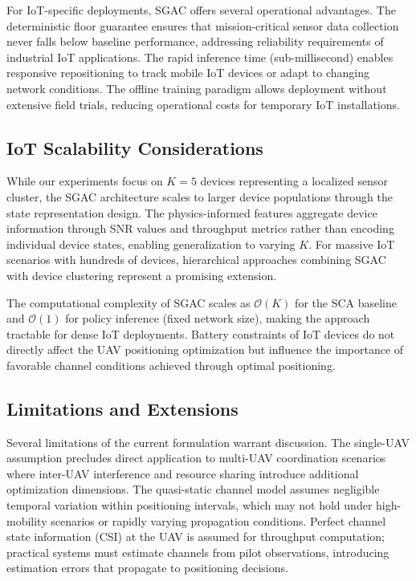 \documentclass[journal]{IEEEtran}
\begin{document}
For IoT-specific deployments, SGAC offers several operational advantages. The deterministic floor guarantee ensures that mission-critical sensor data collection never falls below baseline performance, addressing reliability requirements of industrial IoT applications. The rapid inference time (sub-millisecond) enables responsive repositioning to track mobile IoT devices or adapt to changing network conditions. The offline training paradigm allows deployment without extensive field trials, reducing operational costs for temporary IoT installations.

\subsection{IoT Scalability Considerations}

While our experiments focus on $K=5$ devices representing a localized sensor cluster, the SGAC architecture scales to larger device populations through the state representation design. The physics-informed features aggregate device information through SNR values and throughput metrics rather than encoding individual device states, enabling generalization to varying $K$. For massive IoT scenarios with hundreds of devices, hierarchical approaches combining SGAC with device clustering represent a promising extension.

The computational complexity of SGAC scales as $\mathcal{O}(K)$ for the SCA baseline and $\mathcal{O}(1)$ for policy inference (fixed network size), making the approach tractable for dense IoT deployments. Battery constraints of IoT devices do not directly affect the UAV positioning optimization but influence the importance of favorable channel conditions achieved through optimal positioning.

\subsection{Limitations and Extensions}

Several limitations of the current formulation warrant discussion. The single-UAV assumption precludes direct application to multi-UAV coordination scenarios where inter-UAV interference and resource sharing introduce additional optimization dimensions. The quasi-static channel model assumes negligible temporal variation within positioning intervals, which may not hold under high-mobility scenarios or rapidly varying propagation conditions. Perfect channel state information (CSI) at the UAV is assumed for throughput computation; practical systems must estimate channels from pilot observations, introducing estimation errors that propagate to positioning decisions.
\end{document}
